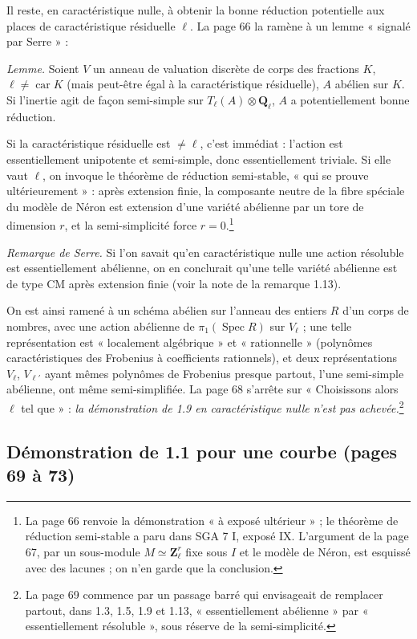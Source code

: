 \documentclass[11pt,a4paper]{article}
\begin{document}
Il reste, en caractéristique nulle, à obtenir la bonne réduction potentielle aux
places de caractéristique résiduelle $\ell$. La page 66 la ramène à un lemme
« signalé par Serre » :

\emph{Lemme.} Soient $V$ un anneau de valuation discrète de corps des fractions
$K$, $\ell \neq \operatorname{car} K$ (mais peut-être égal à la caractéristique
résiduelle), $A$ abélien sur $K$. Si l'inertie agit de façon semi-simple sur
$T_\ell(A) \otimes \mathbf{Q}_\ell$, $A$ a potentiellement bonne réduction.

Si la caractéristique résiduelle est $\neq \ell$, c'est immédiat : l'action est
essentiellement unipotente et semi-simple, donc essentiellement triviale. Si elle
vaut $\ell$, on invoque le théorème de réduction semi-stable, « qui se prouve
ultérieurement » : après extension finie, la composante neutre de la fibre
spéciale du modèle de Néron est extension d'une variété abélienne par un tore de
dimension $r$, et la semi-simplicité force $r = 0$.\footnote{La page 66 renvoie
la démonstration « à exposé ultérieur » ; le théorème de réduction semi-stable a
paru dans SGA 7 I, exposé IX. L'argument de la page 67, par un sous-module
$M \simeq \mathbf{Z}_\ell^r$ fixe sous $I$ et le modèle de Néron, est esquissé
avec des lacunes ; on n'en garde que la conclusion.}

\emph{Remarque de Serre.} Si l'on savait qu'en caractéristique nulle une action
résoluble est essentiellement abélienne, on en conclurait qu'une telle variété
abélienne est de type CM après extension finie (voir la note de la remarque 1.13).

On est ainsi ramené à un schéma abélien sur l'anneau des entiers $R$ d'un corps
de nombres, avec une action abélienne de $\pi_1(\operatorname{Spec} R)$ sur
$V_\ell$ ; une telle représentation est « localement algébrique » et
« rationnelle » (polynômes caractéristiques des Frobenius à coefficients
rationnels), et deux représentations $V_\ell$, $V_{\ell'}$ ayant mêmes polynômes
de Frobenius presque partout, l'une semi-simple abélienne, ont même
semi-simplifiée. La page 68 s'arrête sur « Choisissons alors $\ell$ tel que » :
\emph{la démonstration de 1.9 en caractéristique nulle n'est pas
achevée.}\footnote{La page 69 commence par un passage barré qui envisageait de
remplacer partout, dans 1.3, 1.5, 1.9 et 1.13, « essentiellement abélienne » par
« essentiellement résoluble », sous réserve de la semi-simplicité.}

\subsection*{Démonstration de 1.1 pour une courbe (pages 69 à 73)}
\end{document}
